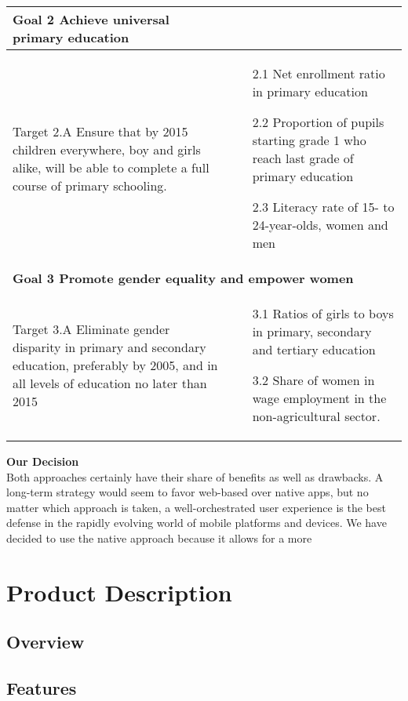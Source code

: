 \begin{center}
\begin{tabularx}{\textwidth}[t]{XX}
\arrayrulecolor{green}\hline
\textbf{\textcolor{myGreen}{Goal 2 Achieve universal primary education}} \\
\hline

Target 2.A Ensure that by 2015 children everywhere, boy and girls alike, will be able to complete a full course of primary schooling. &
\begin{minipage}[t]{\linewidth}%
\begin{itemize}
\item[2.1] Net enrollment ratio in primary education
\item[2.2] Proportion of pupils starting grade 1 who reach last grade of primary education
\item[2.3] Literacy rate of 15- to 24-year-olds, women and men
\end{itemize}
\end{minipage}\\

\hline
\multicolumn{2}{l}{%
\textbf{\textcolor{myGreen}{Goal 3 Promote gender equality and empower women}}} \\
\hline

Target 3.A Eliminate gender disparity in primary and secondary education, preferably by 2005, and in all levels of education no later than 2015 &
\begin{minipage}[t]{\linewidth}%
\begin{itemize}
\item[3.1] Ratios of girls to boys in primary, secondary and tertiary education
\item[3.2] Share of women in wage employment in the non-agricultural sector.
\end{itemize} 
\end{minipage}
\end{tabularx}
\end{center}


\textbf{Our Decision} \\

Both approaches certainly have their share of benefits as well as drawbacks. A long-term strategy would seem to favor web-based over native apps, but no matter which approach is taken, a well-orchestrated user experience is the best defense in the rapidly evolving world of mobile platforms and devices. We have decided to use the native approach because it allows for a more 

\section{Product Description}

\subsection{Overview}

\subsection{Features}








